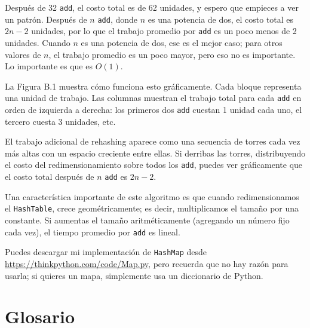Después de 32 \texttt{add}, el costo total es de 62 unidades, y espero que empieces a ver un patrón. Después de \( n \) \texttt{add}, donde \( n \) es una potencia de dos, el costo total es \( 2n - 2 \) unidades, por lo que el trabajo promedio por \texttt{add} es un poco menos de 2 unidades. Cuando \( n \) es una potencia de dos, ese es el mejor caso; para otros valores de \( n \), el trabajo promedio es un poco mayor, pero eso no es importante. Lo importante es que es \( O(1) \).

La Figura B.1 muestra cómo funciona esto gráficamente. Cada bloque representa una unidad de trabajo. Las columnas muestran el trabajo total para cada \texttt{add} en orden de izquierda a derecha: los primeros dos \texttt{add} cuestan 1 unidad cada uno, el tercero cuesta 3 unidades, etc.

El trabajo adicional de rehashing aparece como una secuencia de torres cada vez más altas con un espacio creciente entre ellas. Si derribas las torres, distribuyendo el costo del redimensionamiento sobre todos los \texttt{add}, puedes ver gráficamente que el costo total después de \( n \) \texttt{add} es \( 2n - 2 \).

Una característica importante de este algoritmo es que cuando redimensionamos el \texttt{HashTable}, crece geométricamente; es decir, multiplicamos el tamaño por una constante. Si aumentas el tamaño aritméticamente (agregando un número fijo cada vez), el tiempo promedio por \texttt{add} es lineal.

Puedes descargar mi implementación de \texttt{HashMap} desde \url{https://thinkpython.com/code/Map.py}, pero recuerda que no hay razón para usarla; si quieres un mapa, simplemente usa un diccionario de Python.

\section{Glosario}

